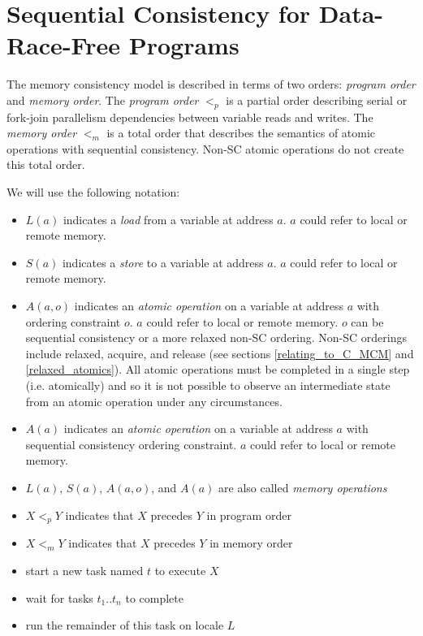 \section{Sequential Consistency for Data-Race-Free Programs}
\label{SC_for_DRF}

The memory consistency model is described in terms of two orders:
\textit{program order} and \textit{memory order}. The \textit{program order}
$<_p$ is a partial order describing serial or fork-join parallelism
dependencies between variable reads and writes. The \textit{memory order} $<_m$
is a total order that describes the semantics of atomic operations with
sequential consistency. Non-SC atomic operations do not create this total
order.

We will use the following notation:
\begin{itemize}

  \item $L(a)$ indicates a \textit{load} from a variable at address $a$.
  $a$ could refer to local or remote memory.

  \item $S(a)$ indicates a \textit{store} to a variable at address $a$.
  $a$ could refer to local or remote memory.

  \item $A(a,o)$ indicates an \textit{atomic operation} on a variable at
  address $a$ with ordering constraint $o$. $a$ could refer to local or
  remote memory.  $o$ can be sequential consistency or a more relaxed
  non-SC ordering.  Non-SC orderings include relaxed, acquire, and release
  (see sections \ref{relating_to_C_MCM} and \ref{relaxed_atomics}). All
  atomic operations must be completed in a single step (i.e. atomically)
  and so it is not possible to observe an intermediate state from an
  atomic operation under any circumstances.

  \item $A(a)$ indicates an \textit{atomic operation} on a variable at
  address $a$ with sequential consistency ordering constraint. $a$ could
  refer to local or remote memory.

  \item $L(a)$, $S(a)$, $A(a,o)$, and $A(a)$ are also called
  \textit{memory operations}

  \item $X <_p Y$ indicates that $X$ precedes $Y$ in program order

  \item $X <_m Y$ indicates that $X$ precedes $Y$ in memory order

  \item {} start a new task named $t$ to execute $X$

  \item {} wait for tasks $t_1..t_n$ to complete

  \item {} run the remainder of this task on locale $L$

\end{itemize}

